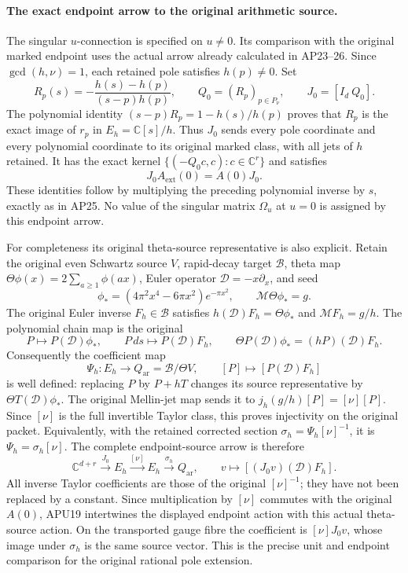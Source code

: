 \paragraph{The exact endpoint arrow to the original arithmetic source.}
The singular \(u\)-connection is specified on \(u\ne0\).
Its comparison with the original marked endpoint uses the actual
arrow already calculated in AP23--26.  Since
\(\gcd(h,\nu)=1\), each retained pole satisfies \(h(p)\ne0\).
Set
\[
 R_p(s)=-\frac{h(s)-h(p)}{(s-p)h(p)},\qquad
 Q_0=(R_p)_{p\in P_\nu},\qquad J_0=[I_d\ Q_0].
 \tag{APU18}
\]
The polynomial identity
\((s-p)R_p=1-h(s)/h(p)\) proves that \(R_p\) is the exact
image of \(r_p\) in \(E_h=\mathbb C[s]/h\).
Thus \(J_0\) sends every pole coordinate and every polynomial
coordinate to its original marked class, with all jets of \(h\)
retained.  It has the exact kernel
\(\{(-Q_0c,c):c\in\mathbb C^r\}\) and satisfies
\[
 J_0A_{\mathrm{ext}}(0)=A(0)J_0.
 \tag{APU19}
\]
These identities follow by multiplying the preceding polynomial
inverse by \(s\), exactly as in AP25.  No value of the singular
matrix \(\Omega_u\) at \(u=0\) is assigned by this endpoint arrow.

For completeness its original theta-source representative is
also explicit.  Retain the original even Schwartz source \(V\),
rapid-decay target \(\mathscr B\), theta map
\(\Theta\phi(x)=2\sum_{a\ge1}\phi(ax)\), Euler operator
\(\mathcal D=-x\partial_x\), and seed
\[
 \phi_*=(4\pi^2x^4-6\pi x^2)e^{-\pi x^2},\qquad
 \mathcal M\Theta\phi_*=g.
\]
The original Euler inverse \(F_h\in\mathscr B\) satisfies
\(h(\mathcal D)F_h=\Theta\phi_*\) and
\(\mathcal MF_h=g/h\).
The polynomial chain map is the original
\[
 P\longmapsto P(\mathcal D)\phi_*,
 \qquad P\,ds\longmapsto P(\mathcal D)F_h,\qquad
 \Theta P(\mathcal D)\phi_*
       =(hP)(\mathcal D)F_h.
 \tag{APU20}
\]
Consequently the coefficient map
\[
 \Psi_h:E_h\longrightarrow
 Q_{\mathrm{ar}}=\mathscr B/\Theta V,\qquad
 [P]\longmapsto[P(\mathcal D)F_h]
 \tag{APU21}
\]
is well defined: replacing \(P\) by \(P+hT\) changes its source
representative by \(\Theta T(\mathcal D)\phi_*\).
The original Mellin-jet map sends it to
\(j_h(g/h)[P]=[\nu][P]\).
Since \([\nu]\) is the full invertible Taylor class, this proves
injectivity on the original packet.  Equivalently, with the
retained corrected section
\(\sigma_h=\Psi_h[\nu]^{-1}\), it is
\(\Psi_h=\sigma_h[\nu]\).
The complete endpoint-source arrow is therefore
\[
 \mathbb C^{d+r}\xrightarrow{J_0}E_h
       \xrightarrow{[\nu]}E_h
       \xrightarrow{\sigma_h}Q_{\mathrm{ar}},
 \qquad
 v\longmapsto[(J_0v)(\mathcal D)F_h].
 \tag{APU22}
\]
All inverse Taylor coefficients are those of the original
\([\nu]^{-1}\); they have not been replaced by a constant.
Since multiplication by \([\nu]\) commutes with the original
\(A(0)\), APU19 intertwines the displayed endpoint action with
this actual theta-source action.  On the transported gauge fibre
the coefficient is \([\nu]J_0v\), whose image under \(\sigma_h\)
is the same source vector.  This is the precise unit and endpoint
comparison for the original rational pole extension.

